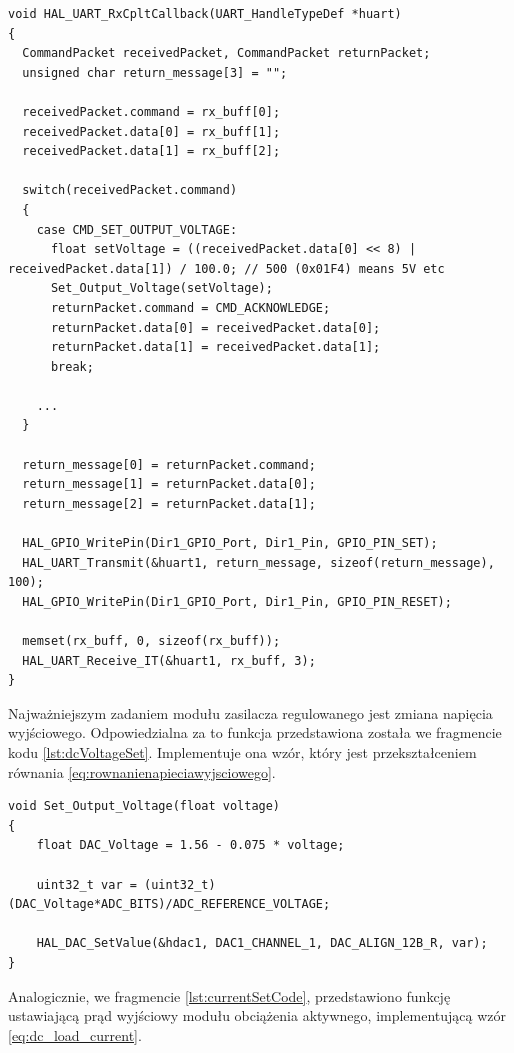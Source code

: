\begin{lstlisting}[label=lst:interruptCode,caption=Funkcja odpowiadająca za ustawienie napięcia wyjściowego., float,frame=tb]
void HAL_UART_RxCpltCallback(UART_HandleTypeDef *huart)
{
  CommandPacket receivedPacket, CommandPacket returnPacket;
  unsigned char return_message[3] = "";

  receivedPacket.command = rx_buff[0];
  receivedPacket.data[0] = rx_buff[1];
  receivedPacket.data[1] = rx_buff[2];

  switch(receivedPacket.command)
  {
    case CMD_SET_OUTPUT_VOLTAGE:
      float setVoltage = ((receivedPacket.data[0] << 8) | receivedPacket.data[1]) / 100.0; // 500 (0x01F4) means 5V etc
      Set_Output_Voltage(setVoltage);
      returnPacket.command = CMD_ACKNOWLEDGE;
      returnPacket.data[0] = receivedPacket.data[0];
      returnPacket.data[1] = receivedPacket.data[1];
      break;

    ...
  }

  return_message[0] = returnPacket.command;
  return_message[1] = returnPacket.data[0];
  return_message[2] = returnPacket.data[1];

  HAL_GPIO_WritePin(Dir1_GPIO_Port, Dir1_Pin, GPIO_PIN_SET);
  HAL_UART_Transmit(&huart1, return_message, sizeof(return_message), 100);
  HAL_GPIO_WritePin(Dir1_GPIO_Port, Dir1_Pin, GPIO_PIN_RESET);

  memset(rx_buff, 0, sizeof(rx_buff));
  HAL_UART_Receive_IT(&huart1, rx_buff, 3);
}
\end{lstlisting}

Najważniejszym zadaniem modułu zasilacza regulowanego jest zmiana napięcia wyjściowego. Odpowiedzialna za to funkcja 
przedstawiona została we fragmencie kodu \ref{lst:dcVoltageSet}.
Implementuje ona wzór, który jest przekształceniem równania \ref{eq:rownanienapieciawyjsciowego}.

\begin{lstlisting}[label=lst:dcVoltageSet,caption=Funkcja odpowiadająca za ustawienie napięcia wyjściowego., float,frame=tb]
void Set_Output_Voltage(float voltage)
{
	float DAC_Voltage = 1.56 - 0.075 * voltage;

	uint32_t var = (uint32_t)(DAC_Voltage*ADC_BITS)/ADC_REFERENCE_VOLTAGE;

	HAL_DAC_SetValue(&hdac1, DAC1_CHANNEL_1, DAC_ALIGN_12B_R, var);
}
\end{lstlisting}

Analogicznie, we fragmencie \ref{lst:currentSetCode}, przedstawiono funkcję ustawiającą prąd wyjściowy modułu obciążenia aktywnego, 
implementującą wzór \ref{eq:dc_load_current}.

